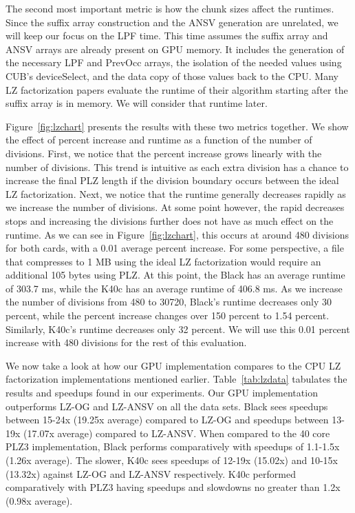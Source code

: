 The second most important metric is how the chunk sizes affect the runtimes. 
Since the suffix array construction and the ANSV generation are unrelated, we will keep our focus on the LPF time.
This time assumes the suffix array and ANSV arrays are already present on GPU memory.
It includes the generation of the necessary LPF and PrevOcc arrays, the isolation of the needed values using CUB's deviceSelect, and the data copy of those values back to the CPU.
Many LZ factorization papers evaluate the runtime of their algorithm starting after the suffix array is in memory.
We will consider that runtime later.

Figure~\ref{fig:lzchart} presents the results with these two metrics together.
We show the effect of percent increase and runtime as a function of the number of divisions.
First, we notice that the percent increase grows linearly with the number of divisions.
This trend is intuitive as each extra division has a chance to increase the final PLZ length if the division boundary occurs between the ideal LZ factorization.
Next, we notice that the runtime generally decreases rapidly as we increase the number of divisions.
At some point however, the rapid decreases stops and increasing the divisions further does not have as much effect on the runtime.
As we can see in Figure~\ref{fig:lzchart}, this occurs at around 480 divisions for both cards, with a 0.01 average percent increase.
For some perspective, a file that compresses to 1 MB using the ideal LZ factorization would require an additional 105 bytes using PLZ.
At this point, the Black has an average runtime of 303.7 ms, while the K40c has an average runtime of 406.8 ms.
As we increase the number of divisions from 480 to 30720, Black's runtime decreases only 30 percent, while the percent increase changes over 150 percent to 1.54 percent.
Similarly, K40c's runtime decreases only 32 percent.
We will use this 0.01 percent increase with 480 divisions for the rest of this evaluation.

We now take a look at how our GPU implementation compares to the CPU LZ factorization implementations mentioned earlier.
Table~\ref{tab:lzdata} tabulates the results and speedups found in our experiments.
Our GPU implementation outperforms LZ-OG and LZ-ANSV on all the data sets.
Black sees speedups between 15-24x (19.25x average) compared to LZ-OG and speedups between 13-19x (17.07x average) compared to LZ-ANSV.
When compared to the 40 core PLZ3 implementation, Black performs comparatively with speedups of 1.1-1.5x (1.26x average).
The slower, K40c sees speedups of 12-19x (15.02x) and 10-15x (13.32x) against LZ-OG and LZ-ANSV respectively.
K40c performed comparatively with PLZ3 having speedups and slowdowns no greater than 1.2x (0.98x average).

